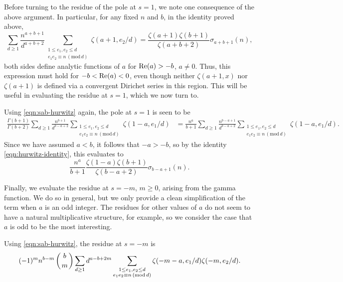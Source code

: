 \documentclass[12pt]{amsart}
\numberwithin{equation}{section}
\numberwithin{theorem}{section}
\renewcommand\Re{\textnormal{Re}}
\renewcommand{\pmod}[1]{\,\left(\mathrm{mod}\,#1\right)}
\begin{document}
Before turning to the residue of the pole at $s=1$, we note one consequence of the above argument.  In particular, for any fixed $n$ and $b$, in the identity proved above,
\begin{equation}\label{eqn:hurwitz-identity}
	\sum_{d \geq 1} \frac{n^{a+b+1}}{d^{a+b+2}} \sum_{\substack{1 \leq e_1,e_2 \leq d \\ e_1e_2 \equiv n \pmod{d}}} \zeta(a+1,e_2/d)
		= \frac{\zeta(a+1)\zeta(b+1)}{\zeta(a+b+2)} \sigma_{a+b+1}(n), 
\end{equation}
both sides define analytic functions of $a$ for $\Re(a)>-b$, $a\neq 0$.  Thus, this expression must hold for $-b<\Re(a)<0$, even though neither $\zeta(a+1,x)$ nor $\zeta(a+1)$ is defined via a convergent Dirichet series in this region.  This will be useful in evaluating the residue at $s=1$, which we now turn to.

Using \eqref{eqn:sab-hurwitz} again, the pole at $s=1$ is seen to be
\begin{align*}
	\frac{\Gamma(b+1)}{\Gamma(b+2)} \sum_{d\geq 1} \frac{n^{b+1}}{d^{b-a+2}} \sum_{\substack{1 \leq e_1,e_2 \leq d \\ e_1e_2 \equiv n \pmod{d}}} \zeta(1-a,e_1/d)
		&= \frac{n^a}{b+1} \sum_{d \geq 1} \frac{n^{b-a+1}}{d^{b-a+2}} \sum_{\substack{1 \leq e_1,e_2 \leq d \\ e_1e_2 \equiv n \pmod{d}}} \zeta(1-a,e_1/d).
\end{align*}
Since we have assumed $a < b$, it follows that $-a > -b$, so by the identity \eqref{eqn:hurwitz-identity}, this evaluates to
\[
	\frac{n^a}{b+1} \frac{\zeta(1-a)\zeta(b+1)}{\zeta(b-a+2)}\sigma_{b-a+1}(n).
\]

Finally, we evaluate the residue at $s=-m$, $m \geq 0$, arising from the gamma function.  We do so in general, but we only provide a clean simplification of the term when $a$ is an odd integer.  The residues for other values of $a$ do not seem to have a natural multiplicative structure, for example, so we consider the case that $a$ is odd to be the most interesting.

Using \eqref{eqn:sab-hurwitz}, the residue at $s=-m$ is
\begin{equation}\label{eqn:s=-m}
	(-1)^m n^{b-m} \left({b}\atop {m}\right) \sum_{d \geq 1} d^{a-b+2m} \sum_{\substack{1 \leq e_1,e_2 \leq d \\ e_1e_2 \equiv n \pmod{d}}} \zeta(-m-a,e_1/d) \zeta(-m,e_2/d).
\end{equation}
\end{document}
